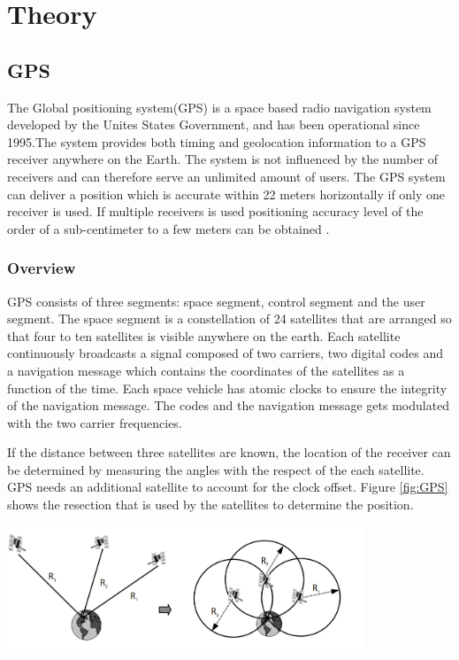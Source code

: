 



\chapter{Theory}
\section{GPS}
The Global positioning system(GPS) is a space based radio navigation system developed by the Unites States Government, and has been operational since 1995.The system provides both timing and geolocation information to a GPS receiver anywhere on the Earth.  The system is not influenced by the number of receivers and can therefore serve an unlimited amount of users. The GPS system can deliver a position which is accurate within 22 meters horizontally if only one receiver is used. If multiple receivers is used positioning accuracy level of the order of a sub-centimeter to a few meters can be obtained \cite{GPS}. 

\subsection{Overview}
GPS consists of three segments: space segment, control segment and the user segment. The space segment is a constellation of 24 satellites that are arranged so that  four to ten satellites is visible anywhere on the earth. Each satellite continuously broadcasts a signal composed of two carriers, two digital codes and a navigation message which contains the coordinates of the satellites as a function of the time. Each space vehicle has atomic clocks to ensure the integrity of the navigation message. The codes and the navigation message gets modulated with the two carrier frequencies. 

If the distance between three satellites are known, the location of the receiver can be determined by measuring the angles with the respect of the each satellite.  GPS needs an additional satellite to account for the clock offset. Figure \ref{fig:GPS} shows the resection that is used by the satellites to determine the position.\\

\begin{minipage}[t]{0.8\textwidth}
\centering
    \includegraphics[width=0.8\textwidth]{Images/gps.PNG}\\
    \captionsetup{justification=centering}
    \label{fig:GPS}
\end{minipage}


